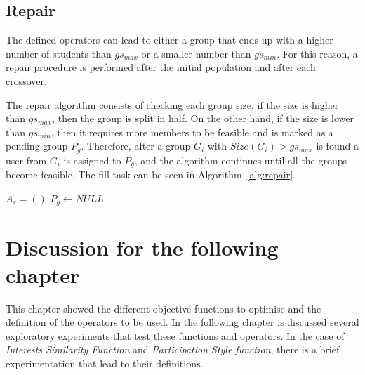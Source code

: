 \subsection{Repair} \label{sec:Repair}

The defined operators can lead to either a group that ends up with a higher number of students than $gs_{max}$ or a smaller number than $gs_{min}$. For this reason, a repair procedure is performed after the initial population and after each crossover.\

The repair algorithm consists of checking each group size, if the size is higher than $gs_{max}$, then the group is split in half. On the other hand, if the size is lower than $gs_{min}$, then it requires more members to be feasible and is marked as a pending group $P_g$.  Therefore, after a group $G_i$ with $Size(G_i) > gs_{max}$ is found a user from $G_i$ is assigned to $P_g$, and the algorithm continues until all the groups become feasible.
The fill task can be seen in Algorithm~\ref{alg:repair}.

\begin{algorithm}[H]
    \caption{Group Repair}
    \label{alg:repair}
    \SetAlgoLined 
    $A_r = ()$\; 
    $P_g \leftarrow NULL$\;
\end{algorithm}

\section{Discussion for the following chapter}

This chapter showed the different objective functions to optimise and the definition of the operators to be used. In the following chapter is discussed several exploratory experiments that test these functions and operators. In the case of \textit{Interests Similarity Function} and \textit{Participation Style function}, there is a brief experimentation that lead to their definitions.
